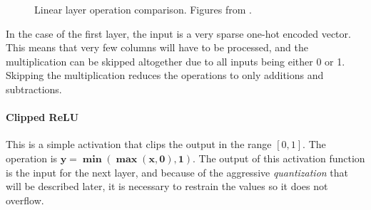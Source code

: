 \begin{figure}[H]
\centering
{}%
\qquad
{}%
\caption{Linear layer operation comparison. Figures from \cite{nnue-pytorch}.}
\label{fig:linear_comparison}
\end{figure}

In the case of the first layer, the input is a very sparse one-hot encoded vector. This means that very few columns will have to be processed, and the multiplication can be skipped altogether due to all inputs being either 0 or 1. Skipping the multiplication reduces the operations to only additions and subtractions.

\paragraph[short]{Clipped ReLU} This is a simple activation that clips the output in the range $[0, 1]$. The operation is $\bm{y=\min(\max(x,0),1)}$.
The output of this activation function is the input for the next layer, and because of the aggressive \textit{quantization} that will be described later, it is necessary to restrain the values so it does not overflow. \\


